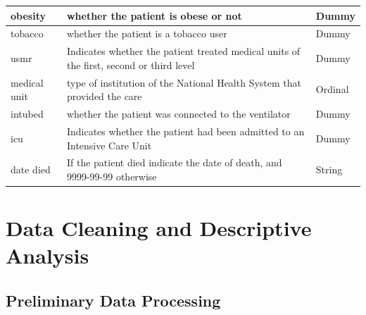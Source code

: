 \documentclass[
  journal=medium,
  manuscript=Report,
  year=2023,
  volume=37,
]{cup-journal}
\begin{document}
\begin{table}[hbt!]
\begin{threeparttable}
\begin{tabular}{lll}
    \midrule
    obesity &  whether the patient is obese or not & Dummy \\ 
    \midrule
    tobacco &  whether the patient is a tobacco user & Dummy \\ 
    \midrule
    usmr &  Indicates whether the patient treated medical units of the first, second or third level & Dummy \\ 
    \midrule
    medical unit &  type of institution of the National Health System that provided the care & Ordinal \\ 
    \midrule
    intubed &  whether the patient was connected to the ventilator & Dummy \\ 
    \midrule
    icu &  Indicates whether the patient had been admitted to an Intensive Care Unit & Dummy \\ 
    \midrule
    date died &  If the patient died indicate the date of death, and 9999-99-99 otherwise & String \\ 
    \bottomrule 
    \end{tabular}
    \end{threeparttable}
\end{table}
    
\section{Data Cleaning and Descriptive Analysis}

\subsection{Preliminary Data Processing}
\end{document}
